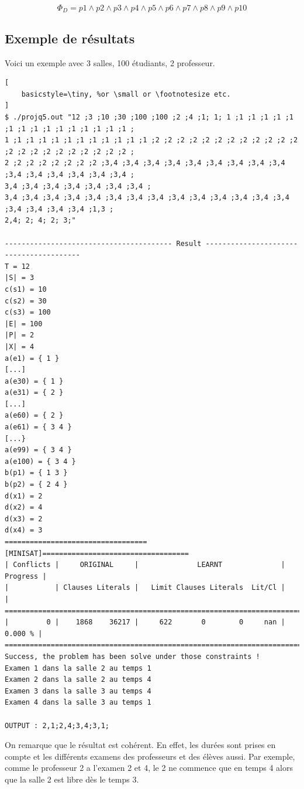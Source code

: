 \documentclass[a4paper,11pt]{article}
\begin{document}
\begin{displaymath}
	\Phi_{D} = p1 \wedge p2 \wedge p3 \wedge p4 \wedge p5 \wedge p6 \wedge p7 \wedge p8 \wedge p9 \wedge p10
\end{displaymath}

\subsection{Exemple de résultats}
Voici un exemple avec 3 salles, 100 étudiants, 2 professeur.
\begin{lstlisting}[
    basicstyle=\tiny, %or \small or \footnotesize etc.
]
$ ./projq5.out "12 ;3 ;10 ;30 ;100 ;100 ;2 ;4 ;1; 1; 1 ;1 ;1 ;1 ;1 ;1 ;1 ;1 ;1 ;1 ;1 ;1 ;1 ;1 ;1 ;1 ;
1 ;1 ;1 ;1 ;1 ;1 ;1 ;1 ;1 ;1 ;1 ;1 ;2 ;2 ;2 ;2 ;2 ;2 ;2 ;2 ;2 ;2 ;2 ;2 ;2 ;2 ;2 ;2 ;2 ;2 ;2 ;2 ;2 ;2 ;
2 ;2 ;2 ;2 ;2 ;2 ;2 ;2 ;3,4 ;3,4 ;3,4 ;3,4 ;3,4 ;3,4 ;3,4 ;3,4 ;3,4 ;3,4 ;3,4 ;3,4 ;3,4 ;3,4 ;3,4 ;
3,4 ;3,4 ;3,4 ;3,4 ;3,4 ;3,4 ;3,4 ;
3,4 ;3,4 ;3,4 ;3,4 ;3,4 ;3,4 ;3,4 ;3,4 ;3,4 ;3,4 ;3,4 ;3,4 ;3,4 ;3,4 ;3,4 ;3,4 ;3,4 ;3,4 ;1,3 ;
2,4; 2; 4; 2; 3;"

---------------------------------------- Result ----------------------------------------
T = 12
|S| = 3
c(s1) = 10
c(s2) = 30
c(s3) = 100
|E| = 100
|P| = 2
|X| = 4
a(e1) = { 1 }
[...]
a(e30) = { 1 }
a(e31) = { 2 }
[...]
a(e60) = { 2 }
a(e61) = { 3 4 }
[...}
a(e99) = { 3 4 }
a(e100) = { 3 4 }
b(p1) = { 1 3 }
b(p2) = { 2 4 }
d(x1) = 2
d(x2) = 4
d(x3) = 2
d(x4) = 3
==================================[MINISAT]===================================
| Conflicts |     ORIGINAL     |              LEARNT              | Progress |
|           | Clauses Literals |   Limit Clauses Literals  Lit/Cl |          |
==============================================================================
|         0 |    1868    36217 |     622       0        0     nan |  0.000 % |
==============================================================================
Success, the problem has been solve under those constraints !
Examen 1 dans la salle 2 au temps 1
Examen 2 dans la salle 2 au temps 4
Examen 3 dans la salle 3 au temps 4
Examen 4 dans la salle 3 au temps 1

OUTPUT : 2,1;2,4;3,4;3,1;

\end{lstlisting}
On remarque que le résultat est cohérent. En effet, les durées sont prises en compte et les différents examens des professeurs et des élèves aussi. Par exemple, comme le professeur 2 a l'examen 2 et 4, le 2 ne commence que en temps 4 alors que la salle 2 est libre dès le temps 3.
\end{document}
